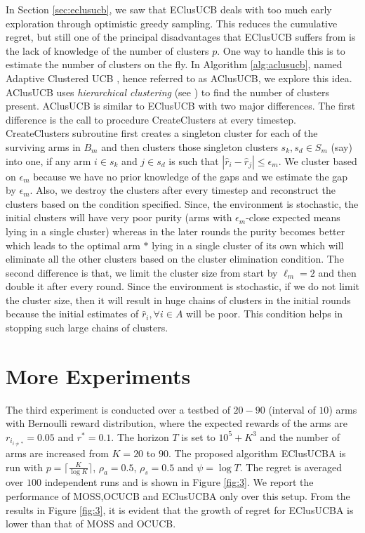 In Section \ref{sec:eclusucb}, we saw that EClusUCB deals with too much early exploration through optimistic greedy sampling. This reduces the cumulative regret, but still one of the principal disadvantages that EClusUCB suffers from is the lack of knowledge of the number of clusters $p$. One way to handle this is to estimate the number of clusters on the fly. In Algorithm \ref{alg:aclusucb}, named Adaptive Clustered UCB , hence referred to as AClusUCB, we explore this idea. AClusUCB uses \emph{hierarchical clustering} (see \cite{friedman2001elements}) to find the number of clusters present. AClusUCB is similar to EClusUCB with two major differences. The first difference is the call to procedure CreateClusters at every timestep. CreateClusters subroutine first creates a singleton cluster for each of the surviving arms in $B_{m}$ and then clusters those singleton clusters $s_{k}, s_{d}\in S_{m}$ (say) into one, if any arm $i\in s_{k}$ and $j\in s_{d}$ is such that $|\hat{r}_{i}-\hat{r}_{j}|\leq \epsilon_{m}$. We cluster based on $\epsilon_{m}$ because we have no prior knowledge of the gaps and we estimate the gap by $\epsilon_{m}$. Also, we destroy the clusters after every timestep and reconstruct the clusters based on the condition specified. Since, the environment is stochastic, the initial clusters will have very poor purity (arms with $\epsilon_{m}$-close expected means lying in a single cluster) whereas in the later rounds the purity becomes better which leads to the optimal arm $*$ lying in a single cluster of its own which will eliminate all the other clusters based on the cluster elimination condition. The second difference is that, we limit the cluster size from start by $\ell_{m}=2$ and then double it after every round. Since the environment is stochastic, if we do not limit the cluster size, then it will result in huge chains of clusters in the initial rounds because the initial estimates of $\hat{r}_{i},\forall i\in A$ will be poor. This condition helps in stopping such large chains of clusters.    

\section{More Experiments}
\label{App:MoreExp}

The third experiment is conducted over a testbed of $20-90$ (interval of $10$) arms with Bernoulli reward distribution, where the expected rewards of the arms are $r_{i_{{i}\neq {*}}}=0.05$ and $r^{*}=0.1$. The horizon $T$ is set to $10^{5} + K^{3}$ and the number of arms are increased from $K=20$ to $90$. The proposed algorithm EClusUCBA is run with $p=\lceil \frac{K}{\log K} \rceil$, $\rho_a=0.5$, $\rho_s=0.5$ and $\psi=\log T$. The regret is averaged over $100$ independent runs and is shown in Figure \ref{fig:3}. We report the performance of MOSS,OCUCB and EClusUCBA only over this setup. From the results in Figure \ref{fig:3}, it is evident that the growth of regret for EClusUCBA is lower than that of MOSS and OCUCB. 

